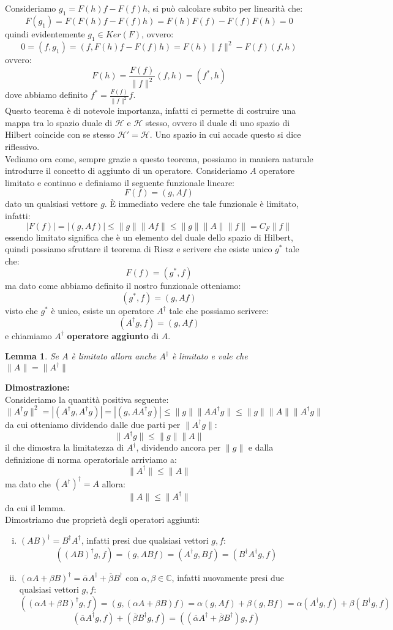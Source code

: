 \documentclass[12pt]{book}
\theoremstyle{plain}
\newcommand{\C}{\mathbb{C}}
\renewcommand{\H}{\mathcal{H}}
\newtheorem{lem}[thm]{Lemma}
\theoremstyle{definition}
\theoremstyle{remark}
\begin{document}
Consideriamo $g_1 = F(h)f-F(f)h$, si può calcolare subito per linearità che:
\[F(g_1) = F(F(h)f-F(f)h) = F(h)F(f)-F(f)F(h) = 0 \]
quindi evidentemente $g_1\in Ker(F)$, ovvero:
\[0=(f,g_1) = (f,F(h)f-F(f)h ) = F(h)\|f\|^2 - F(f)(f,h)\]
ovvero:
\[F(h) = \frac{F(f)}{\|f\|^2}(f,h) = (f^*,h)\]
dove abbiamo definito $f^* = \frac{F(f)}{\|f\|^2}f$.\\
\newline
Questo teorema è di notevole importanza, infatti ci permette di costruire una mappa tra lo spazio duale di $\H$ e $\H$ stesso, ovvero il duale di uno spazio di Hilbert coincide con se stesso $\H'=\H$. Uno spazio in cui accade questo si dice riflessivo.\\
Vediamo ora come, sempre grazie a questo teorema, possiamo in maniera naturale introdurre il concetto di aggiunto di un operatore. Consideriamo $A$ operatore limitato e continuo e definiamo il seguente funzionale lineare:
\[F(f) = (g,Af)\]
dato un qualsiasi vettore $g$. È immediato vedere che tale funzionale è limitato, infatti:
\[|F(f)| = |(g,Af)| \leq \|g\|\|Af\|\leq \|g\|\|A\|\|f\| = C_F \|f\|\]
essendo limitato significa che è un elemento del duale dello spazio di Hilbert, quindi possiamo sfruttare il teorema di Riesz e scrivere che esiste unico $g^*$ tale che:
\[F(f) = (g^*,f)\]
ma dato come abbiamo definito il nostro funzionale otteniamo:
\[(g^*,f) = (g,Af)\]
visto che $g^*$ è unico, esiste un operatore $A^\dagger$ tale che possiamo scrivere:
\[(A^\dagger g,f) = (g,Af)\]
e chiamiamo $A^\dagger$ \textbf{operatore aggiunto} di $A$.
\begin{lem}
Se $A$ è limitato allora anche $A^\dagger$ è limitato e vale che $\|A\|=\|A^\dagger\|$
\end{lem}
\hspace{-1.6em}\textbf{Dimostrazione:}\\
Consideriamo la quantità positiva seguente:
\[\|A^\dagger g\|^2 = |(A^\dagger g, A^\dagger g)| = |(g,AA^\dagger g)| \leq \|g\| \|AA^\dagger g\| \leq  \|g\| \|A\|\|A^\dagger g\|\]
da cui otteniamo dividendo dalle due parti per $\|A^\dagger g\|$:
\[\|A^\dagger g\|\leq \|g\| \|A\|\]
il che dimostra la limitatezza di $A^\dagger$, dividendo ancora per $\|g\|$ e dalla definizione di norma operatoriale arriviamo a:
\[\|A^\dagger \| \leq \|A\|\]
ma dato che $(A^\dagger)^\dagger = A$ allora:
\[\|A \| \leq \|A^\dagger\|\]
da cui il lemma.\\
\newline
Dimostriamo due proprietà degli operatori aggiunti:
\begin{enumerate}[i.]
\item $(AB)^\dagger = B^\dagger A^\dagger$, infatti presi due qualsiasi vettori $g,f$:
\[((AB)^\dagger g,f) =(g,ABf) = (A^\dagger g,Bf) = (B^\dagger A^\dagger g,f) \]
\item $(\alpha A + \beta B)^\dagger = \overline{\alpha}A^\dagger + \overline{\beta}B^\dagger$ con $\alpha,\beta\in\C$, infatti nuovamente presi due qualsiasi vettori $g,f$:
\[((\alpha A + \beta B)^\dagger g,f) = (g,(\alpha A + \beta B)f) = \alpha(g,Af) + \beta(g,Bf) = \alpha(A^\dagger g,f) + \beta(B^\dagger g,f)\]
\[ (\overline{\alpha}A^\dagger g,f) + (\overline{\beta}B^\dagger g,f)= ((\overline{\alpha}A^\dagger + \overline{\beta}B^\dagger)g,f) \]
\end{enumerate}
\end{document}
